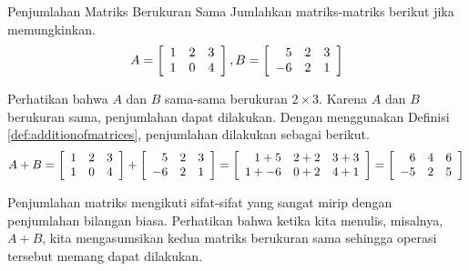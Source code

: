\begin{example}{Penjumlahan Matriks Berukuran Sama}\label{exa:samesizematrixaddition}
Jumlahkan matriks-matriks berikut jika memungkinkan.
\begin{equation*}
A = \left[
\begin{array}{ccc}
1 & 2 & 3 \\
1 & 0 & 4
\end{array}
\right],
B = \left[
\begin{array}{rrr}
5 & 2 & 3 \\
-6 & 2 & 1
\end{array}
\right]
\end{equation*}
\end{example}

\begin{solution}
Perhatikan bahwa $A$ dan $B$ sama-sama berukuran $2 \times 3$.
Karena $A$ dan $B$ berukuran sama, penjumlahan dapat dilakukan. Dengan menggunakan Definisi \ref{def:additionofmatrices},
penjumlahan dilakukan sebagai berikut. 
\begin{equation*}
A + B = \left[
\begin{array}{rrr}
1 & 2 & 3 \\
1 & 0 & 4
\end{array}
\right]
+
\left[
\begin{array}{rrr}
5 & 2 & 3 \\
-6 & 2 & 1
\end{array}
\right]
=\allowbreak 
\left[
\begin{array}{rrr}
1+5 & 2+2 & 3+3 \\
1+ -6 & 0+2 & 4+1
\end{array}
\right]
=
\left[
\begin{array}{rrr}
6 & 4 & 6 \\
-5 & 2 & 5
\end{array}
\right]
\end{equation*}
\end{solution}

Penjumlahan matriks mengikuti sifat-sifat yang sangat mirip dengan
penjumlahan bilangan biasa. Perhatikan bahwa ketika kita menulis, misalnya, $A+B$, kita
mengasumsikan kedua matriks berukuran sama sehingga operasi tersebut
memang dapat dilakukan.

